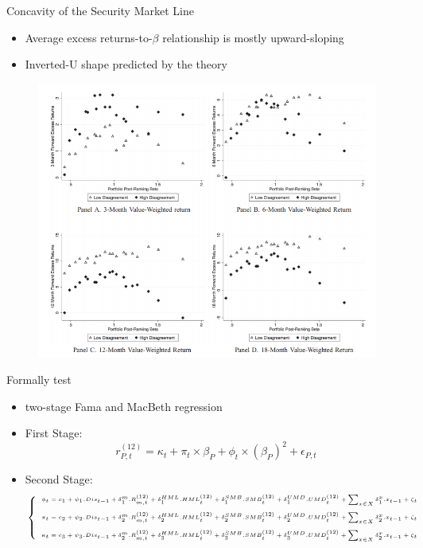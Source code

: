 \documentclass{beamer}
\begin{document}
\begin{frame}{Concavity of the Security Market Line}
\begin{itemize}
\item  Average excess returns-to-$ \beta $ relationship is mostly
upward-sloping 
\item   Inverted-U shape predicted by the theory
\end{itemize}
\begin{figure}
\centering
\includegraphics[width=0.5\linewidth]{6}
\end{figure}
\end{frame}

\begin{frame}{Formally test}
\begin{itemize}
\item two-stage Fama and MacBeth regression

\item First Stage: \begin{equation*}
r_{P,t}^{(12)} = \kappa_t + \pi_t \times \beta_P + \phi_t \times (\beta_P)^2 + \epsilon_{P,t}
\end{equation*}
\item Second Stage:
\begin{equation*}
\tiny
\left\{\begin{array}{l}
 \phi_t  = c_1 + \psi_1 . Dis_{t-1} + \delta^m_1 . R^{(12)}_{m,t} + \delta^{HML}_1. HML^{(12)}_t + \delta^{SMB}_1. SMB^{(12)}_t  + \delta^{UMD}_1. UMD^{(12)}_t + \sum_{x\in X}\delta^x_1.x_{t-1} + \zeta_t \\\\
  \pi_t  = c_2 + \psi_2 . Dis_{t-1} + \delta^m_2 . R^{(12)}_{m,t} + \delta^{HML}_2. HML^{(12)}_t + \delta^{SMB}_2. SMB^{(12)}_t  + \delta^{UMD}_2. UMD^{(12)}_t + \sum_{x\in X}\delta^x_2.x_{t-1} + \zeta_t 
  \\\\
    \kappa_t  = c_3 + \psi_3 . Dis_{t-1} + \delta^m_2 . R^{(12)}_{m,t} + \delta^{HML}_3. HML^{(12)}_t + \delta^{SMB}_3. SMB^{(12)}_t  + \delta^{UMD}_3. UMD^{(12)}_t + \sum_{x\in X}\delta^x_2.x_{t-1} + \zeta_t 
\end{array}\right.
\end{equation*}

\end{itemize}
\end{frame}
\end{document}
